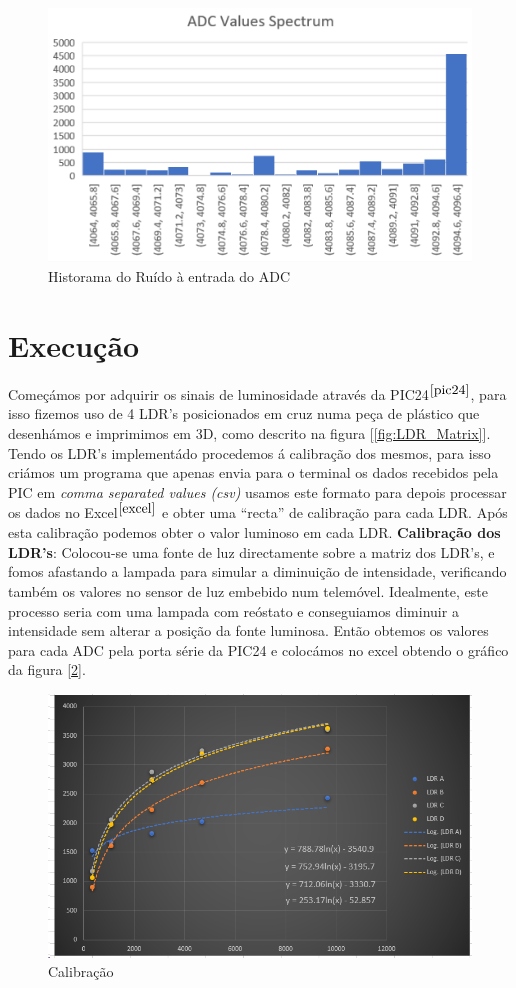\documentclass[12pt]{article}
\begin{document}
\begin{figure}[H]
        \centering
        \includegraphics[width=0.4\linewidth]{imgs/Hist_Noise_ADC.png}
        \caption{Historama do Ruído à entrada do ADC}
        \label{fig:Hist_Noise_ADC}
\end{figure}
\newpage
\section{Execução}
\par Começámos por adquirir os sinais de luminosidade através da PIC24$^{\cite{pic24}}$, para isso fizemos uso de 4 LDR's posicionados em cruz numa peça de plástico que desenhámos e imprimimos em 3D, como descrito na figura [\ref{fig:LDR_Matrix}].\\
Tendo os LDR's implementádo procedemos á calibração dos mesmos, para isso criámos um programa que apenas envia para o terminal os dados recebidos pela PIC em \textit{comma separated values (csv)} usamos este formato para depois processar os dados no Excel$^{\cite{excel}}$ e obter uma “recta” de calibração para cada LDR. Após esta calibração podemos obter o valor luminoso em cada LDR.
\textbf{Calibração dos LDR's}: Colocou-se uma fonte de luz directamente sobre a matriz dos LDR's, e fomos afastando a lampada para simular a diminuição de intensidade, verificando também os valores no sensor de luz embebido num telemóvel. Idealmente, este processo seria com uma lampada com reóstato e conseguiamos diminuir a intensidade sem alterar a posição da fonte luminosa. Então obtemos os valores para cada ADC pela porta série da PIC24 e colocámos no excel obtendo o gráfico da figura [\ref{fig:cal}].


\begin{figure}[H]
        \centering
        \includegraphics[width=0.7\linewidth]{imgs/ldrcal.png}
        \caption{Calibração}
        \label{fig:cal}
\end{figure}
\end{document}
